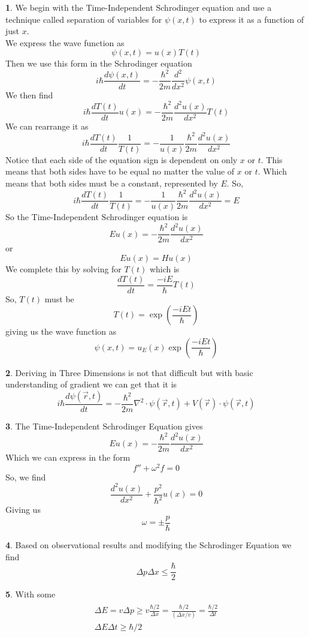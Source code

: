 \documentclass[11pt, twocolumn]{article}
\newcommand{\wave}{\psi (x,t)}
\newcommand{\dif}[2]{\frac{d#1}{d#2}}
\newcommand{\diff}[3]{\frac{d^#3 #1}{d #2^#3}}
\theoremstyle{definition}
\newtheorem{ans}{}
\begin{document}
	\begin{ans}
		We begin with the Time-Independent Schrodinger equation and use a technique called separation of variables for $ \wave $ to express it as a function of just $ x $. \\
		We express the wave function as
		\[ \wave = u(x)T(t) \]
		Then we use this form in the Schrodinger equation
		\[ i\hbar \dif{\wave}{t} = -\frac{\hbar^2}{2m} \diff{}{x}{2} \wave \]
		We then find
		\[ i\hbar \dif{T(t)}{t} u(x) = -\frac{\hbar^2}{2m} \diff{u(x)}{x}{2} T(t)\]
		We can rearrange it as
		\[ i\hbar \dif{T(t)}{t} \frac{1}{T(t)} = -\frac{1}{u(x)}\frac{\hbar^2}{2m} \diff{u(x)}{x}{2} \]
		Notice that each side of the equation sign is dependent on only $ x $ or $ t $. This means that both sides have to be equal no matter the value of $ x $ or $ t $. Which means that both sides must be a constant, represented by $ E $. So, 
		\[ i\hbar \dif{T(t)}{t} \frac{1}{T(t)} = -\frac{1}{u(x)}\frac{\hbar^2}{2m} \diff{u(x)}{x}{2} = E\]
		So the Time-Independent Schrodinger equation is 
		\[ Eu(x) =  -\frac{\hbar^2}{2m} \diff{u(x)}{x}{2}\]
		or
		\[ Eu(x) = Hu(x) \]
		We complete this by solving for $ T(t) $ which is 
		\[ \dif{T(t)}{t} = \frac{-i E}{\hbar} T(t) \]
		So, $ T(t) $ must be
		\[ T(t) = \exp(\frac{-iEt}{\hbar}) \]
		giving us the wave function as
		\[ \wave = u_E(x) \exp(\frac{-iEt}{\hbar}) \]
	\end{ans}
	\begin{ans}
		Deriving in Three Dimensions is not that difficult but with basic understanding of gradient we can get that it is 
		\[ i \hbar \dif{\psi(\vec{r}, t)}{t} = -\frac{\hbar^2}{2m} \nabla^2 \cdot \psi(\vec{r}, t) + V(\vec{r}) \cdot \psi(\vec{r}, t) \]
	\end{ans}
	\begin{ans}
		The Time-Independent Schrodinger Equation gives 
		\[ Eu(x) = -\frac{\hbar^2}{2m} \diff{u(x)}{x}{2}\]
		Which we can express in the form
		\[ f'' + \omega^2 f = 0 \]
		So, we find
		\[ \diff{u(x)}{x}{2} + \frac{p^2}{\hbar^2} u(x) = 0  \]
		Giving us
		\[ \omega = \pm \frac{p}{\hbar} \]
	\end{ans}
	\begin{ans}
		Based on observational results and modifying the Schrodinger Equation we find
		\[ \Delta p \Delta x \leq \dfrac{\hbar}{2} \]
	\end{ans}
	\begin{ans}
		With some 
		\begin{align}
		\begin{array} { c } { \Delta E = v \Delta p \geq v \frac { \hbar / 2 } { \Delta x } = \frac { \hbar / 2 } { ( \Delta x / v ) } = \frac { \hbar / 2 } { \Delta t } } \\ { \Delta E \Delta t \geq \hbar / 2 } \end{array}
		\end{align}
	\end{ans}
\end{document}
